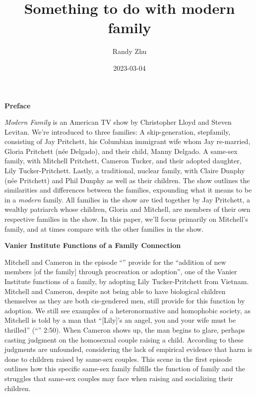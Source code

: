 \documentclass[12pt, letterpaper]{article}
\title{Something to do with modern family}
\author{Randy Zhu}
\date{2023-03-04}
\begin{document}
\begin{titlepage}
    \maketitle
\end{titlepage}


\begin{center}
    \textbf{Preface}
\end{center}

\textit{Modern Family} is an American TV show by Christopher Lloyd and Steven Levitan. We're introduced to three families: A skip-generation, stepfamily, consisting of Jay Pritchett, his Columbian immigrant wife whom Jay re-married, Gloria Pritchett (née Delgado), and their child, Manny Delgado. A same-sex family, with Mitchell Pritchett, Cameron Tucker, and their adopted daughter, Lily Tucker-Pritchett. Lastly, a traditional, nuclear family, with Claire Dunphy (née Pritchett) and Phil Dunphy as well as their children. The show outlines the similarities and differences between the families, expounding what it means to be in a \textit{modern} family. All families in the show are tied together by Jay Pritchett, a wealthy patriarch whose children, Gloria and Mitchell, are members of their own respective families in the show. In this paper, we'll focus primarily on Mitchell's family, and at times compare with the other families in the show.

\begin{center}
    \textbf{Vanier Institute Functions of a Family Connection}
\end{center}

Mitchell and Cameron in the episode ``'' provide for the ``addition of new members [of the family] through procreation or adoption'', one of the Vanier Institute functions of a family, \autocite[11]{mitchell:2018} by adopting Lily Tucker-Pritchett from Vietnam. Mitchell and Cameron, despite not being able to have biological children themselves as they are both cis-gendered men, still provide for this function by adoption. We still see examples of a heteronormative and homophobic society, as Mitchell is told by a man that ``[Lily]'s an angel, you and your wife must be thrilled'' (``'' 2:50). When Cameron shows up, the man begins to glare, perhaps casting judgment on the homosexual couple raising a child. According to \autocite[239-240]{mitchell:2018} these judgments are unfounded, considering the lack of empirical evidence that harm is done to children raised by same-sex couples. This scene in the first episode outlines how this specific same-sex family fulfills the function of family and the struggles that same-sex couples may face when raising and socializing their children.
\end{document}
